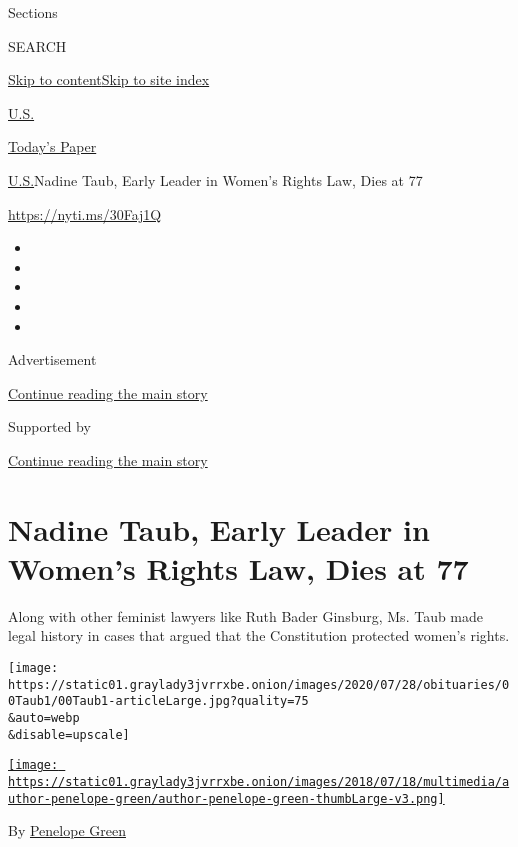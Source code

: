 Sections

SEARCH

\protect\hyperlink{site-content}{Skip to
content}\protect\hyperlink{site-index}{Skip to site index}

\href{https://www.nytimes3xbfgragh.onion/section/us}{U.S.}

\href{https://myaccount.nytimes3xbfgragh.onion/auth/login?response_type=cookie\&client_id=vi}{}

\href{https://www.nytimes3xbfgragh.onion/section/todayspaper}{Today's
Paper}

\href{/section/us}{U.S.}\textbar{}Nadine Taub, Early Leader in Women's
Rights Law, Dies at 77

\url{https://nyti.ms/30Faj1Q}

\begin{itemize}
\item
\item
\item
\item
\item
\end{itemize}

Advertisement

\protect\hyperlink{after-top}{Continue reading the main story}

Supported by

\protect\hyperlink{after-sponsor}{Continue reading the main story}

\hypertarget{nadine-taub-early-leader-in-womens-rights-law-dies-at-77}{%
\section{Nadine Taub, Early Leader in Women's Rights Law, Dies at
77}\label{nadine-taub-early-leader-in-womens-rights-law-dies-at-77}}

Along with other feminist lawyers like Ruth Bader Ginsburg, Ms. Taub
made legal history in cases that argued that the Constitution protected
women's rights.

\texttt{[image: https://static01.graylady3jvrrxbe.onion/images/2020/07/28/obituaries/00Taub1/00Taub1-articleLarge.jpg?quality=75\\\&auto=webp\\\&disable=upscale]}

\href{https://www.nytimes3xbfgragh.onion/by/penelope-green}{\texttt{[image: https://static01.graylady3jvrrxbe.onion/images/2018/07/18/multimedia/author-penelope-green/author-penelope-green-thumbLarge-v3.png]}}

By \href{https://www.nytimes3xbfgragh.onion/by/penelope-green}{Penelope
Green}

